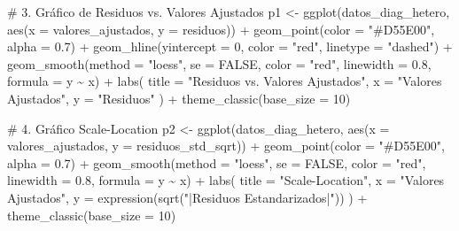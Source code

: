 \documentclass[
  letterpaper,
  DIV=11,
  numbers=noendperiod]{scrreprt}
\newenvironment{Shaded}{\begin{snugshade}}{\end{snugshade}}
\newcommand{\AttributeTok}[1]{\textcolor[rgb]{0.40,0.45,0.13}{#1}}
\newcommand{\CommentTok}[1]{\textcolor[rgb]{0.37,0.37,0.37}{#1}}
\newcommand{\ConstantTok}[1]{\textcolor[rgb]{0.56,0.35,0.01}{#1}}
\newcommand{\DecValTok}[1]{\textcolor[rgb]{0.68,0.00,0.00}{#1}}
\newcommand{\FloatTok}[1]{\textcolor[rgb]{0.68,0.00,0.00}{#1}}
\newcommand{\FunctionTok}[1]{\textcolor[rgb]{0.28,0.35,0.67}{#1}}
\newcommand{\NormalTok}[1]{\textcolor[rgb]{0.00,0.23,0.31}{#1}}
\newcommand{\OtherTok}[1]{\textcolor[rgb]{0.00,0.23,0.31}{#1}}
\newcommand{\SpecialCharTok}[1]{\textcolor[rgb]{0.37,0.37,0.37}{#1}}
\newcommand{\StringTok}[1]{\textcolor[rgb]{0.13,0.47,0.30}{#1}}
\begin{document}
\begin{tcolorbox}
\begin{Shaded}
\begin{Highlighting}[]
\CommentTok{\# 3. Gráfico de Residuos vs. Valores Ajustados}
\NormalTok{p1 }\OtherTok{\textless{}{-}} \FunctionTok{ggplot}\NormalTok{(datos\_diag\_hetero, }\FunctionTok{aes}\NormalTok{(}\AttributeTok{x =}\NormalTok{ valores\_ajustados, }\AttributeTok{y =}\NormalTok{ residuos)) }\SpecialCharTok{+}
  \FunctionTok{geom\_point}\NormalTok{(}\AttributeTok{color =} \StringTok{"\#D55E00"}\NormalTok{, }\AttributeTok{alpha =} \FloatTok{0.7}\NormalTok{) }\SpecialCharTok{+}
  \FunctionTok{geom\_hline}\NormalTok{(}\AttributeTok{yintercept =} \DecValTok{0}\NormalTok{, }\AttributeTok{color =} \StringTok{"red"}\NormalTok{, }\AttributeTok{linetype =} \StringTok{"dashed"}\NormalTok{) }\SpecialCharTok{+}
  \FunctionTok{geom\_smooth}\NormalTok{(}\AttributeTok{method =} \StringTok{"loess"}\NormalTok{, }\AttributeTok{se =} \ConstantTok{FALSE}\NormalTok{, }\AttributeTok{color =} \StringTok{"red"}\NormalTok{, }\AttributeTok{linewidth =} \FloatTok{0.8}\NormalTok{, }\AttributeTok{formula =}\NormalTok{ y }\SpecialCharTok{\textasciitilde{}}\NormalTok{ x) }\SpecialCharTok{+}
  \FunctionTok{labs}\NormalTok{(}
    \AttributeTok{title =} \StringTok{"Residuos vs. Valores Ajustados"}\NormalTok{,}
    \AttributeTok{x =} \StringTok{"Valores Ajustados"}\NormalTok{,}
    \AttributeTok{y =} \StringTok{"Residuos"}
\NormalTok{  ) }\SpecialCharTok{+}
  \FunctionTok{theme\_classic}\NormalTok{(}\AttributeTok{base\_size =} \DecValTok{10}\NormalTok{)}

\CommentTok{\# 4. Gráfico Scale{-}Location}
\NormalTok{p2 }\OtherTok{\textless{}{-}} \FunctionTok{ggplot}\NormalTok{(datos\_diag\_hetero, }\FunctionTok{aes}\NormalTok{(}\AttributeTok{x =}\NormalTok{ valores\_ajustados, }\AttributeTok{y =}\NormalTok{ residuos\_std\_sqrt)) }\SpecialCharTok{+}
  \FunctionTok{geom\_point}\NormalTok{(}\AttributeTok{color =} \StringTok{"\#D55E00"}\NormalTok{, }\AttributeTok{alpha =} \FloatTok{0.7}\NormalTok{) }\SpecialCharTok{+}
  \FunctionTok{geom\_smooth}\NormalTok{(}\AttributeTok{method =} \StringTok{"loess"}\NormalTok{, }\AttributeTok{se =} \ConstantTok{FALSE}\NormalTok{, }\AttributeTok{color =} \StringTok{"red"}\NormalTok{, }\AttributeTok{linewidth =} \FloatTok{0.8}\NormalTok{, }\AttributeTok{formula =}\NormalTok{ y }\SpecialCharTok{\textasciitilde{}}\NormalTok{ x) }\SpecialCharTok{+}
  \FunctionTok{labs}\NormalTok{(}
    \AttributeTok{title =} \StringTok{"Scale{-}Location"}\NormalTok{,}
    \AttributeTok{x =} \StringTok{"Valores Ajustados"}\NormalTok{,}
    \AttributeTok{y =} \FunctionTok{expression}\NormalTok{(}\FunctionTok{sqrt}\NormalTok{(}\StringTok{"|Residuos Estandarizados|"}\NormalTok{))}
\NormalTok{  ) }\SpecialCharTok{+}
  \FunctionTok{theme\_classic}\NormalTok{(}\AttributeTok{base\_size =} \DecValTok{10}\NormalTok{)}


\end{Highlighting}
\end{Shaded}
\end{tcolorbox}
\end{document}

